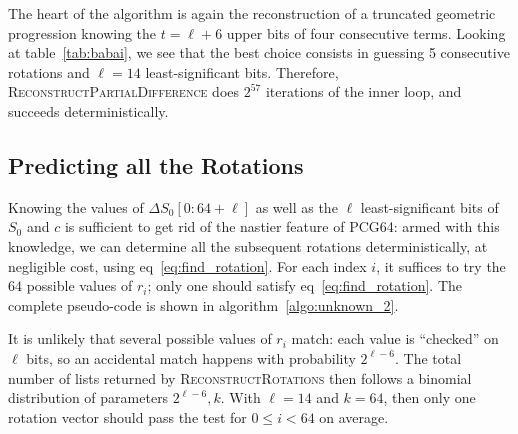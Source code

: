 \documentclass[submission,svgnames,journal=tosc]{iacrtrans}
\begin{document}
The heart of the algorithm is again the reconstruction of a truncated geometric
progression knowing the \(t=\ell+6\) upper bits of four consecutive terms. Looking at table~\ref{tab:babai}, we see that the best choice
consists in guessing 5 consecutive rotations and $\ell=14$ least-significant
bits. Therefore, \textsc{ReconstructPartialDifference} does $2^{57}$ iterations
of the inner loop, and succeeds deterministically.

\subsection{Predicting all the Rotations}

Knowing the values of $\Delta S_0[0:64+\ell]$ as well as the $\ell$
least-significant bits of $S_0$ and $c$ is sufficient to get rid of the nastier
feature of \textsf{PCG64}: armed with this knowledge, we can determine all the
subsequent rotations deterministically, at negligible cost, using
eq~\eqref{eq:find_rotation}. For each index $i$, it suffices to try the $64$
possible values of $r_i$; only one should satisfy
eq~\eqref{eq:find_rotation}. The complete pseudo-code is shown in
algorithm~\ref{algo:unknown_2}.

It is unlikely that several possible values of $r_i$ match: each value is
``checked'' on $\ell$ bits, so an accidental match happens with probability
$2^{\ell-6}$. The total number of lists returned by
\textsc{ReconstructRotations} then follows a binomial distribution of parameters
$2^{\ell-6}, k$. With $\ell=14$ and $k=64$, then only one rotation vector should
pass the test for $0 \leq i < 64$ on average.
\end{document}
